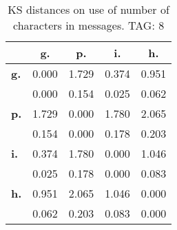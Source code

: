 \begin{table}[h!]
\begin{center}
\begin{tabular}{| l || c | c | c | c |}\hline
 & {\bf g.} & {\bf p.} & {\bf i.} & {\bf h.} \\\hline\hline
{\bf g.} & 0.000 & 1.729 & 0.374 & 0.951 \\
{\bf } & 0.000 & 0.154 & 0.025 & 0.062 \\\hline
{\bf p.} & 1.729 & 0.000 & 1.780 & 2.065 \\
{\bf } & 0.154 & 0.000 & 0.178 & 0.203 \\\hline
{\bf i.} & 0.374 & 1.780 & 0.000 & 1.046 \\
{\bf } & 0.025 & 0.178 & 0.000 & 0.083 \\\hline
{\bf h.} & 0.951 & 2.065 & 1.046 & 0.000 \\
{\bf } & 0.062 & 0.203 & 0.083 & 0.000 \\\hline
\end{tabular}
\caption{KS distances on use of number of characters in messages. TAG: 8}
\end{center}
\end{table}